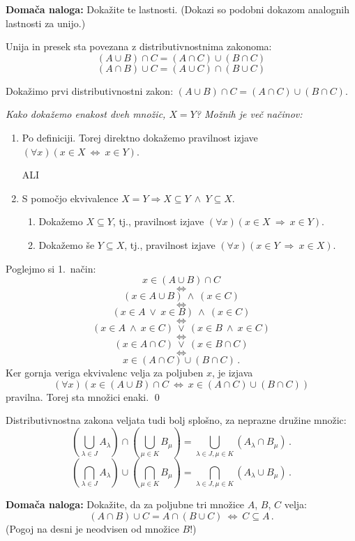 \documentclass[11pt,paper=b5,footinclude,headinclude]{scrbook} %
\def\ali {{~\vee~}}
\def\inn {{~\wedge~}}
\def\sledi {{~\Rightarrow~}}
\def\cee {{~\Leftrightarrow~}}
\begin{document}
\bigskip
\textbf{ Domača naloga:} Dokažite te lastnosti. (Dokazi so podobni dokazom analognih lastnosti za unijo.)

\bigskip
Unija in presek sta povezana z distributivnostnima zakonoma:
$$(A\cup B)\cap C = (A\cap C)\cup (B\cap C)$$
$$(A\cap B)\cup C = (A\cup C)\cap (B\cup C)$$

Dokažimo prvi distributivnostni zakon:
$(A\cup B)\cap C = (A\cap C)\cup (B\cap C)$.

{\em Kako dokažemo enakost dveh množic, $X = Y$? Možnih je več načinov:
\begin{enumerate}
 \item Po definiciji. Torej
    direktno dokažemo pravilnost izjave $(\forall x)(x\in X\cee x\in Y)$.

    ALI

\item  S pomočjo ekvivalence $X = Y \Longrightarrow X\subseteq Y \inn Y\subseteq X$.
\begin{enumerate}
         \item   Dokažemo $X\subseteq Y$, tj., pravilnost izjave $(\forall x)(x\in X\sledi x\in Y)$.
 \item Dokažemo še $Y\subseteq X$, tj., pravilnost izjave $(\forall x)(x\in Y\sledi x\in X)$.
        \end{enumerate}
        \end{enumerate}}

Poglejmo si 1.~način:
$$x\in (A\cup B)\cap C$$
$$\cee$$
$$(x\in A\cup B) \inn (x\in C)$$
$$\cee$$
$$(x\in A\ali x\in B) \inn (x\in C)$$
$$\cee$$
$$(x\in A \inn  x\in C)\ali (x\in B \inn  x\in C) $$
$$\cee$$
$$(x\in A \cap C)\ali (x\in B \cap C) $$
$$\cee$$
$$x\in (A \cap C)\cup (B \cap C)\,.$$
Ker gornja veriga ekvivalenc velja za poljuben $x$, je izjava
$$(\forall x)(x\in (A\cup B)\cap C\cee x\in (A \cap C)\cup (B \cap C))$$
pravilna. Torej sta množici enaki.
\qed

Distributivnostna zakona veljata tudi bolj splošno, za neprazne družine množic:
$$(\bigcup_{\lambda\in J}A_\lambda)\cap (\bigcup_{\mu\in K}B_\mu) =
\bigcup_{\lambda\in J, \mu\in K}(A_\lambda\cap B_\mu)\,.$$
$$(\bigcap_{\lambda\in J}A_\lambda)\cup (\bigcap_{\mu\in K}B_\mu) =
\bigcap_{\lambda\in J, \mu\in K}(A_\lambda\cup B_\mu)\,.$$

\medskip
\textbf{ Domača naloga:} Dokažite, da za poljubne tri množice $A$, $B$, $C$ velja:
$$(A\cap B)\cup C = A\cap (B\cup C) \cee C\subseteq A\,.$$
(Pogoj na desni je neodvisen od množice $B$!)

%
%
%
%
%
%
\bigskip
\end{document}
